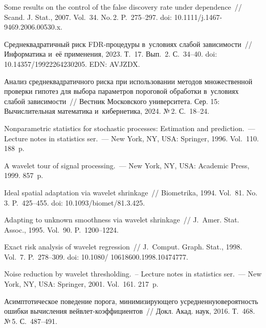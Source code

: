 \begin{multicols}{2}
{{\begin{thebibliography}{99}
Some results on the control of the false discovery rate under dependence~// 
Scand. J. Stat., 2007. Vol.~34. No.\,2. P.~275--297.
doi: 10.1111/j.1467-9469.2006.00530.x.

Среднеквадратичный риск FDR-про\-це\-ду\-ры в~условиях слабой за\-ви\-си\-мости~// 
Информатика и~её применения, 2023. Т.~17. Вып.~2. С.~34--40.
doi: 10.14357/19922264230205. EDN: AVJZDX.

Анализ среднеквадратичного риска при использовании методов множественной 
проверки гипотез для выбора параметров пороговой обработки в~условиях слабой 
зависимости~// Вестник Московского университета. Сер. 15: Вычислительная 
математика и~кибернетика, 2024. №\,2. С.~18--24.

Nonparametric statistics for stochastic processes: Estimation and prediction.~--- 
Lecture notes in statistics ser.~--- New York, NY, USA: Springer, 1996. Vol.~110. 
188~p.

A wavelet tour of signal processing.~--- New York, NY, USA: Academic Press, 1999. 
857~p.

Ideal spatial adaptation via wavelet shrinkage~// Biometrika, 1994. Vol.~81. 
No.\,3. P.~425--455. doi: 10.1093/biomet/81.3.425.

Adapting to unknown smoothness via wavelet shrinkage~// J.~Amer. Stat. Assoc., 
1995. Vol.~90. P.~1200--1224.

Exact risk analysis of wavelet regression~// J.~Comput. Graph. Stat., 1998. 
Vol.~7. P.~278--309. doi: 10.1080/ 10618600.1998.10474777.

Noise reduction by wavelet thresholding.~-- Lecture notes in statistics ser.~--- 
New York, NY, USA: Springer, 2001. Vol.~161. 217~p.

Асимптотическое поведение порога, минимизирующего усредненную\linebreak вероятность ошибки 
вычисления вейв\-лет-ко\-эф\-фи\-ци\-ен\-тов~// Докл. Акад. наук, 2016. Т.~468. №\,5. 
С.~487--491.


\end{thebibliography}}}
\end{multicols}
